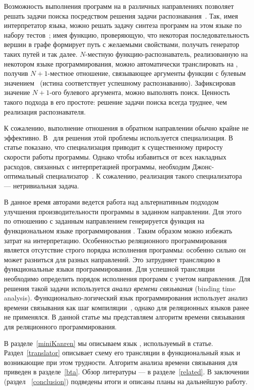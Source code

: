 \documentclass[conference,american,russian]{IEEEtran}
\begin{document}
Возможность выполнения программ на \miniKanren{} в различных направлениях позволяет решать задачи поиска посредством решения задачи распознавания~\cite{lozov2019relational}.
Так, имея интерпретатор языка, можно решать задачу синтеза программ на этом языке по набору тестов~\cite{byrd2017unified}; имея функцию, проверяющую, что некоторая последовательность вершин в графе формирует путь с желаемыми свойствами, получать генератор таких путей и так далее. 
$N$-местную функцию-распознаватель, реализованную на некотором языке программирования, можно автоматически транслировать на \miniKanren{}, получив $N+1$-местное отношение, связывающее аргументы функции с булевым значением~\cite{lozov2019relational} (истина соответствует успешному распознаванию). 
Зафиксировав значение $N+1$-ого булевого аргумента, можно выполнять поиск. 
Ценность такого подхода в его простоте: решение задачи поиска всегда труднее, чем реализация распознавателя. 

К сожалению, выполнение отношения в обратном направлении обычно крайне не эффективно. 
В~\cite{lozov2019relational} для решения этой проблемы используется специализация. 
В статье показано, что специализация приводит к существенному приросту скорости работы программы.
Однако чтобы избавиться от всех накладных расходов, связанных с интерпретацией программы, необходим Джонс-оптимальный специализатор~\cite{jones1993partial}. 
К сожалению, реализация такого специализатора --- нетривиальная задача.

В данное время авторами ведется работа над альтернативным подходом улучшения производительности программы в заданном направлении. 
Для этого по отношению с заданным направлением генерируется функция на функциональном языке программирования \haskell{}. 
Таким образом можно избежать затрат на интерпретацию. 
Особенностью реляционного программирования является отсутствие строго порядка исполнения программы: особенно сильно он может разниться для разных направлений.
Это затрудняет трансляцию в функциональные языки программирования. 
Для успешной трансляции необходимо определить порядок исполнения программ с учетом направления. 
Для решения такой задачи используется \textit{анализ времени связывания} (binding time analysis). 
Функционально-логический язык программирования \mercury{} использует анализ времени связывания как шаг компиляции~\cite{vanhoof2004binding}, однако для реляционных языков ранее не применялся.
В данной статье мы представляем алгоритм времени связывания для реляционного программирования. 

В разделе~\ref{miniKanren} мы описываем язык \miniKanren{}, используемый в статье.
Раздел~\ref{translator} описывает схему его трансляции в функциональный язык и возникающие при этом трудности.
Алгоритм анализа времени связывания для \miniKanren{} приведен в разделе~\ref{bta}. 
Обзор литературы --- в разделе~\ref{related}.
В заключении (раздел ~\ref{conclusion}) подведены итоги и описаны планы на дальнейшую работу. 
\end{document}
